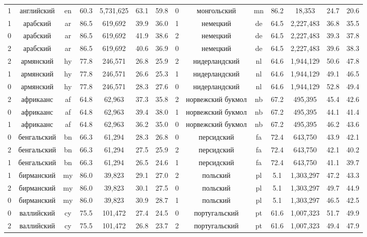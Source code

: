 \begin{table*}
{\begin{tabular}{|c|c|c|c|c|c|c|||c|c|c|c|c|c|c|}
1 & английский & en & 60.3 & 5,731,625 & 63.1 & 59.8 & 0 & монгольский & mn & 86.2 & 18,353 & 24.7 & 20.6\\
1 & арабский & ar & 86.5 & 619,692 & 39.9 & 36.0 & 1 & немецкий & de & 64.5 & 2,227,483 & 36.8 & 35.5\\
0 & арабский & ar & 86.5 & 619,692 & 41.9 & 38.6 & 2 & немецкий & de & 64.5 & 2,227,483 & 39.3 & 37.8\\
2 & арабский & ar & 86.5 & 619,692 & 40.6 & 36.9 & 0 & немецкий & de & 64.5 & 2,227,483 & 39.6 & 38.3\\
2 & армянский & hy & 77.8 & 246,571 & 26.8 & 25.9 & 2 & нидерландский & nl & 64.6 & 1,944,129 & 50.6 & 47.8\\
1 & армянский & hy & 77.8 & 246,571 & 26.6 & 25.3 & 1 & нидерландский & nl & 64.6 & 1,944,129 & 49.1 & 46.5\\
0 & армянский & hy & 77.8 & 246,571 & 28.3 & 27.6 & 0 & нидерландский & nl & 64.6 & 1,944,129 & 52.8 & 49.4\\
2 & африкаанс & af & 64.8 & 62,963 & 37.3 & 35.8 & 2 & норвежский букмол & nb & 67.2 & 495,395 & 45.4 & 42.6\\
0 & африкаанс & af & 64.8 & 62,963 & 39.4 & 38.0 & 1 & норвежский букмол & nb & 67.2 & 495,395 & 44.1 & 41.4\\
1 & африкаанс & af & 64.8 & 62,963 & 36.2 & 35.0 & 0 & норвежский букмол & nb & 67.2 & 495,395 & 46.2 & 43.6\\
0 & бенгальский & bn & 66.3 & 61,294 & 28.3 & 26.8 & 0 & персидский & fa & 72.4 & 643,750 & 43.9 & 42.1\\
2 & бенгальский & bn & 66.3 & 61,294 & 27.5 & 25.9 & 2 & персидский & fa & 72.4 & 643,750 & 42.1 & 40.2\\
1 & бенгальский & bn & 66.3 & 61,294 & 26.5 & 24.6 & 1 & персидский & fa & 72.4 & 643,750 & 41.1 & 39.7\\
1 & бирманский & my & 86.0 & 39,823 & 29.1 & 27.0 & 2 & польский & pl & 5.1 & 1,303,297 & 47.2 & 43.3\\
2 & бирманский & my & 86.0 & 39,823 & 30.1 & 27.5 & 0 & польский & pl & 5.1 & 1,303,297 & 49.7 & 44.9\\
0 & бирманский & my & 86.0 & 39,823 & 30.9 & 28.7 & 1 & польский & pl & 5.1 & 1,303,297 & 46.5 & 42.5\\
0 & валлийский & cy & 75.5 & 101,472 & 27.4 & 24.5 & 0 & португальский & pt & 61.6 & 1,007,323 & 51.7 & 49.9\\
2 & валлийский & cy & 75.5 & 101,472 & 26.8 & 23.7 & 2 & португальский & pt & 61.6 & 1,007,323 & 49.4 & 47.9\\

\end{tabular}}
\end{table*}
